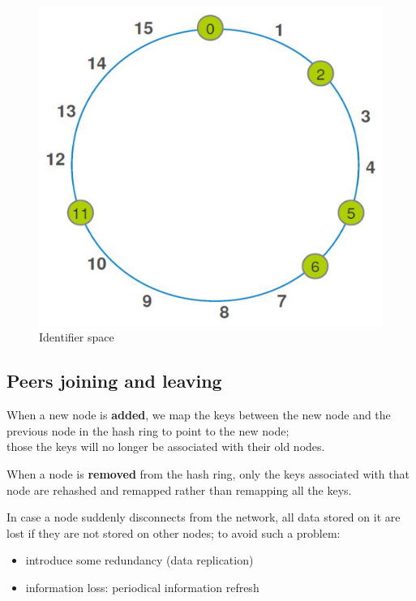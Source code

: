 \begin{paracol}{2}
   \begin{figure}[htbp]
      \centering
      \includegraphics{images/DHT_build1.png}
      \caption{Identifier space}
      \label{fig:DHT_build1}
   \end{figure}
   
\end{paracol}

\subsection{Peers joining and leaving}
When a new node is \textbf{added}, we map the keys between the new node and the previous node in the hash ring to point to the new node;\\
those the keys will no longer be associated with their old nodes.

When a node is \textbf{removed} from the hash ring, only the keys associated with that node are rehashed and remapped rather than remapping all the keys.

In case a node suddenly disconnects from the network, all data stored on it are lost if they are not stored on other nodes;
to avoid such a problem:
\begin{itemize}
   \item introduce some redundancy (data replication)
   \item information loss: periodical information refresh
\end{itemize}

